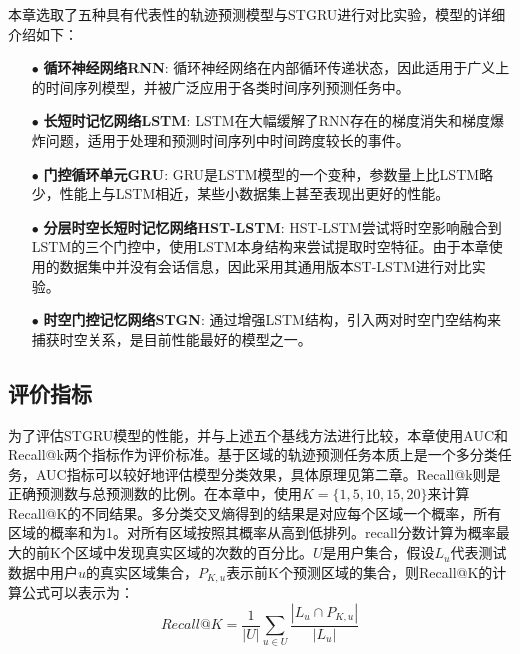 \documentclass[master]{thesis-uestc}
\begin{document}
本章选取了五种具有代表性的轨迹预测模型与STGRU进行对比实验，模型的详细介绍如下：
\begin{itemize}
\item[$\bullet$] \textbf{循环神经网络RNN}: 循环神经网络在内部循环传递状态，因此适用于广义上的时间序列模型，并被广泛应用于各类时间序列预测任务中。

\item[$\bullet$] \textbf{长短时记忆网络LSTM}: LSTM在大幅缓解了RNN存在的梯度消失和梯度爆炸问题，适用于处理和预测时间序列中时间跨度较长的事件。

\item[$\bullet$] \textbf{门控循环单元GRU}: GRU是LSTM模型的一个变种，参数量上比LSTM略少，性能上与LSTM相近，某些小数据集上甚至表现出更好的性能。

\item[$\bullet$] \textbf{分层时空长短时记忆网络HST-LSTM}: HST-LSTM尝试将时空影响融合到LSTM的三个门控中，使用LSTM本身结构来尝试提取时空特征。由于本章使用的数据集中并没有会话信息，因此采用其通用版本ST-LSTM进行对比实验。

\item[$\bullet$] \textbf{时空门控记忆网络STGN}: 通过增强LSTM结构，引入两对时空门空结构来捕获时空关系，是目前性能最好的模型之一。
\end{itemize}

\subsection{评价指标}
为了评估STGRU模型的性能，并与上述五个基线方法进行比较，本章使用AUC和Recall@k两个指标作为评价标准。基于区域的轨迹预测任务本质上是一个多分类任务，AUC指标可以较好地评估模型分类效果，具体原理见第二章。Recall@k则是正确预测数与总预测数的比例。在本章中，使用$K=\{1,5,10,15,20\}$来计算Recall@K的不同结果。多分类交叉熵得到的结果是对应每个区域一个概率，所有区域的概率和为1。对所有区域按照其概率从高到低排列。recall分数计算为概率最大的前K个区域中发现真实区域的次数的百分比。$U$是用户集合，假设$L_u$代表测试数据中用户$u$的真实区域集合，$P_{K,u}$表示前K个预测区域的集合，则Recall@K的计算公式可以表示为：
\begin{equation}
Recall@K = \frac{1}{|U|} \sum_{u\in U}\frac{|L_u\cap P_{K,u}|}{|L_u|}
\end{equation}
\end{document}
